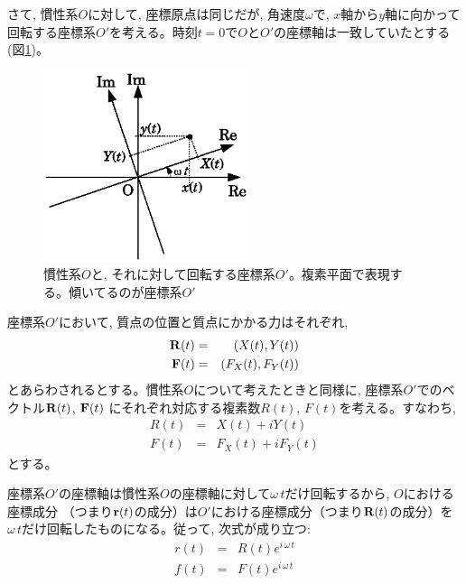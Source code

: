 さて, 慣性系$O$に対して, 座標原点は同じだが, 角速度$\omega$で, $x$軸から$y$軸に向かって回転する座標系$O'$を考える。時刻$t=0$で$O$と$O'$の座標軸は一致していたとする(図\ref{fig:inert_circle})。

\begin{figure}[h]
    \centering
    \includegraphics[width=6cm]{inert_circle.eps}
    \caption{慣性系$O$と, それに対して回転する座標系$O'$。複素平面で表現する。傾いてるのが座標系$O'$}\label{fig:inert_circle}
\end{figure}

座標系$O'$において, 質点の位置と質点にかかる力はそれぞれ, 
\begin{eqnarray}
{\bf R}(t)&=&(X(t), Y(t))\\
{\bf F}(t)&=&(F_X(t), F_Y(t))
\end{eqnarray}
とあらわされるとする。慣性系$O$について考えたときと同様に, 座標系$O'$でのベクトル${\bf R}(t)$, ${\bf F}(t)$
にそれぞれ対応する複素数$R(t)$, $F(t)$を考える。すなわち, 
\begin{eqnarray}
R(t)&=&X(t)+iY(t)\\
F(t)&=&F_X(t)+iF_Y(t)
\end{eqnarray}
とする。

座標系$O'$の座標軸は慣性系$O$の座標軸に対して$\omega\,t$だけ回転するから, $O$における座標成分
（つまり${\bf r}(t)$の成分）は$O'$における座標成分（つまり${\bf R}(t)$の成分）を
$\omega\,t$だけ回転したものになる。従って, 次式が成り立つ:
\begin{eqnarray}
r(t)&=&R(t)e^{i\,\omega\,t}\label{eq:rRrotat}\\
f(t)&=&F(t)e^{i\,\omega\,t}\label{eq:fFrotat}
\end{eqnarray}

